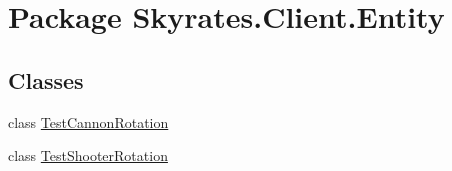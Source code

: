 \hypertarget{namespace_skyrates_1_1_client_1_1_entity}{\section{Package Skyrates.\-Client.\-Entity}
\label{namespace_skyrates_1_1_client_1_1_entity}
}
\subsection*{Classes}
\begin{DoxyCompactItemize}
\item 
class \hyperlink{class_skyrates_1_1_client_1_1_entity_1_1_test_cannon_rotation}{Test\-Cannon\-Rotation}
\item 
class \hyperlink{class_skyrates_1_1_client_1_1_entity_1_1_test_shooter_rotation}{Test\-Shooter\-Rotation}
\end{DoxyCompactItemize}
